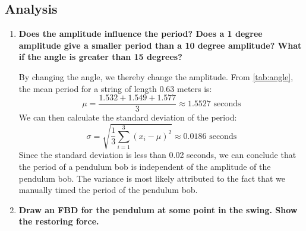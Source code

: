 \documentclass[article, 12pt]{article}
\def\rope#1{ \draw[black,line width=1.4] #1; \draw[rope,line width=1.1] #1; }
\begin{document}
    \subsection{Analysis}
    \begin{enumerate}[1)]
        \item \textbf{Does the amplitude influence the period?  Does a 1 degree amplitude give a smaller period than a 10 degree amplitude?  What if the angle is greater than 15 degrees?}

        By changing the angle, we thereby change the amplitude. From \autoref{tab:angle}, the mean period for a string of length 0.63 meters is:
        \begin{equation}
            \mu = \frac{1.532 + 1.549 + 1.577}{3} \approx 1.5527 \text{ seconds}
            \label{eq:mean}
        \end{equation}
    We can then calculate the standard deviation of the period:
    \begin{equation}
        \sigma = \sqrt{\frac{1}{3}\sum_{i=1}^{3}(x_i - \mu)^2} \approx 0.0186 \text{ seconds}
        \label{eq:std}
    \end{equation}
    Since the standard deviation is less than 0.02 seconds, we can conclude that the period of a pendulum bob is independent of the amplitude of the pendulum bob. The variance is most likely attributed to the fact that we manually timed the period of the pendulum bob. \\
    \item \textbf{Draw an FBD for the pendulum at some point in the swing.  Show the restoring force.}
    \begin{figure}[H]
        \centering
    \def\L{4}  %
    \def\ang{30} %
    \def\R{0.25} %
    \def\F{1.0}  %
\end{figure}
\end{enumerate}
\end{document}
